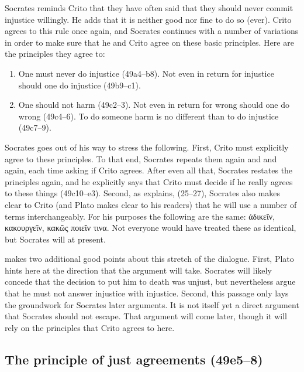\documentclass[11pt]{article}
\begin{document}
Socrates reminds Crito that they have often said that they should never commit injustice willingly.  He adds that it is neither good nor fine to do so (ever).  Crito agrees to this rule once again, and Socrates continues with a number of variations in order to make sure that he and Crito agree on these basic principles.  Here are the principles they agree to:

\begin{enumerate}
    \item One must never do injustice (49a4--b8).  Not even in return for
        injustice should one do injustice (49b9--c1).
    \item One should not harm (49c2--3).  Not even in return for wrong should
        one do wrong (49c4--6).  To do someone harm is no different than to do
        injustice (49c7--9).
\end{enumerate}

Socrates goes out of his way to stress the following.  First, Crito must
explicitly agree to these principles.  To that end, Socrates repeats them again
and and again, each time asking if Crito agrees.  After even all that, Socrates
restates the principles again, and he explicitly says that Crito must decide if
he really agrees to these things (49c10--e3).  Second, as \citet{kraut1984}
explains, (25--27), Socrates also makes clear to Crito (and Plato makes clear
to his readers) that he will use a number of terms interchangeably.  For his
purposes the following are the same: {\g ἀδικεῖν}, {\g κακουργεῖν}, {\g κακῶς
ποιεῖν τινα}.  Not everyone would have treated these as identical, but Socrates
will at present.

\citet{kraut1984} makes two additional good points about this stretch of the
dialogue.  First, Plato hints here at the direction that the argument will
take. Socrates will likely concede that the decision to put him to death was
unjust, but nevertheless argue that he must not answer injustice with
injustice.  Second, this passage only lays the groundwork for Socrates later
arguments.  It is not itself yet a direct argument that Socrates should not
escape.  That argument will come later, though it will rely on the principles
that Crito agrees to here.


\subsection{The principle of just agreements (49e5--8)}
\end{document}
